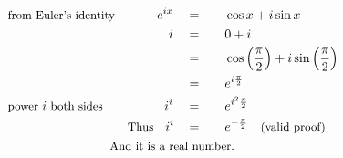 \begin{alignat*}{5}
&\small\text{from Euler's identity}&e^{ix}\quad&=\quad&&\cos{x}+i\sin{x}\\
&\,&i\quad&=&&0+i\\
&\,&\,&=&&\cos{\left(\frac{\pi}{2}\right)}+i\sin{\left(\frac{\pi}{2}\right)}\\
&\,&\,&=&&e^{i\frac{\pi}{2}}\\
&\small\text{power }\normalsize i\small\text{ both sides}&i^i\quad&=&& e^{i^2\frac{\pi}{2}}\\
&\,&\small\text{Thus}\quad i^i\quad&=\quad&&e^{-\frac{\pi}{2}}\quad\small\text{(valid proof)}\\
&\rlap{\qquad\qquad\qquad\qquad\small\text{And it is a real number.}}
\end{alignat*}
